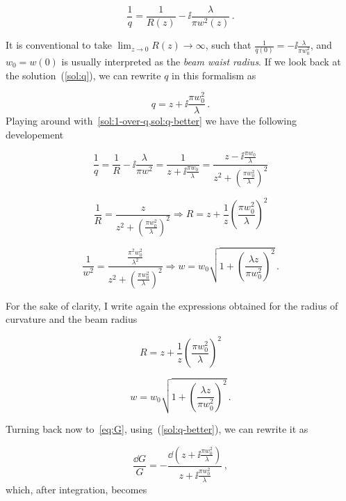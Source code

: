 \documentclass[12pt, class=report, crop=false]{standalone}
\begin{document}
\begin{equation}
  \label{sol:1-over-q}
  \frac{1}{q} = \frac{1}{R(z)} - \ii \frac{\lambda}{\pi w^2 (z)}\,.
\end{equation}

It is conventional to take \(\lim_{z\to0} R(z) \rightarrow \infty\), such that \(\frac{1}{q(0)} = -\ii \frac{\lambda}{\pi w_0^2}\), and \(w_0=w(0)\) is usually interpreted as the \textit{beam waist radius}. If we look back at the solution~(\ref{sol:q}), we can rewrite \(q\) in this formalism as

\begin{equation}
  \label{sol:q-better}
  q = z + \ii \frac{\pi w_0^2}{\lambda}\,.
\end{equation}
Playing around with~\cref{sol:1-over-q,sol:q-better} we have the following developement

\begin{equation*}
  \frac{1}{q} = \frac{1}{R} - \ii \frac{\lambda}{\pi w^2} = \frac{1}{z+ \ii \frac{\pi w_0}{\lambda}} = \frac{z - \ii \frac{\pi w_0}{\lambda}}{z^2 + \left(\frac{\pi w_0^2}{\lambda} \right)^2}
\end{equation*}

\begin{equation*}
  \frac{1}{R} = \frac{z}{z^2 + \left(\frac{\pi w_0^2}{\lambda} \right)^2} \Rightarrow R = z + \frac{1}{z} \left(\frac{\pi w_0^2}{\lambda} \right)^2
\end{equation*}

\begin{equation*}
  \frac{1}{w^2} = \frac{\frac{\pi^2 w_0^2}{\lambda^2}}{z^2 + \left(\frac{\pi w_0^2}{\lambda} \right)^2} \Rightarrow w = w_0 \sqrt{1+ \left(\frac{\lambda z}{\pi w_0^2}\right)^2}\,.
\end{equation*}

For the sake of clarity, I write again the expressions obtained for the radius of curvature and the beam radius

\begin{equation}
  R = z + \frac{1}{z} \left(\frac{\pi w_0^2}{\lambda} \right)^2
\end{equation}

\begin{equation}
  w = w_0 \sqrt{1+ \left(\frac{\lambda z}{\pi w_0^2}\right)^2}\,.
\end{equation}

Turning back now to~\cref{eq:G}, using~(\ref{sol:q-better}), we can rewrite it as

\begin{equation*}
  \frac{\dd{G}}{G} = - \frac{\dd(z+\ii \frac{\pi w_0^2}{\lambda})}{z + \ii \frac{\pi w_0^2}{\lambda}}\,,
\end{equation*}
which, after integration, becomes
\end{document}
